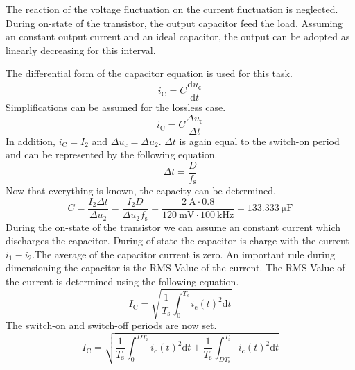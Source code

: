 \begin{solutionblock}
    The reaction of the voltage fluctuation on the current fluctuation is neglected. During on-state of the transistor, the output capacitor feed the load. Assuming an constant output current and an ideal capacitor, the output can be adopted as linearly decreasing for this interval.

    The differential form of the capacitor equation is used for this task.
    \begin{equation}
        i_\mathrm{C}=C \frac{\mathrm{d}u_\mathrm{c}}{\mathrm{d}t}
    \end{equation}
    Simplifications can be assumed for the lossless case.
    \begin{equation}
        i_\mathrm{C}=C \frac{\Delta u_\mathrm{c}}{\Delta t}
    \end{equation}
    In addition, $i_\mathrm{C}=I_\mathrm{2}$ and $\Delta u_\mathrm{c}=\Delta u_\mathrm{2}$.
    $\Delta t$ is again equal to the switch-on period and can be represented by the following equation.
    \begin{equation}
        \Delta t = \frac{D}{f_\mathrm{s}}  
    \end{equation}
    Now that everything is known, the capacity can be determined.
    \begin{equation}
        C = \frac{I_\mathrm{2}\Delta t}{\Delta u_\mathrm{2}}= \frac{I_\mathrm{2}D}{\Delta u_\mathrm{2}f_\mathrm{s}}=\frac{\SI{2}{\ampere}\cdot 0.8}{\SI{120}{\milli\volt} \cdot \SI{100}{\kilo\hertz}}=\SI{133.333}{\micro\farad}
    \end{equation}
     During the on-state of the transistor we can assume an constant current which discharges the capacitor. During of-state the capacitor is charge with the current $i_\mathrm{1}-i_\mathrm{2}$.The average of the capacitor current is zero. An important rule during dimensioning the capacitor is the RMS Value of the current.
     The RMS Value of the current is determined using the following equation.
     \begin{equation}
        I_\mathrm{C}=\sqrt{\frac{1}{T_\mathrm{s}}\int_{0}^{T_\mathrm{s}}i_\mathrm{c}(t)^2\mathrm{d}t}
     \end{equation}
     The switch-on and switch-off periods are now set.
     \begin{equation}
        I_\mathrm{C}=\sqrt{\frac{1}{T_\mathrm{s}}\int_{0}^{DT_\mathrm{s}}i_\mathrm{c}(t)^2\mathrm{d}t+\frac{1}{T_\mathrm{s}}\int_{DT_\mathrm{s}}^{T_\mathrm{s}}i_\mathrm{c}(t)^2\mathrm{d}t}

\end{equation}
\end{solutionblock}
